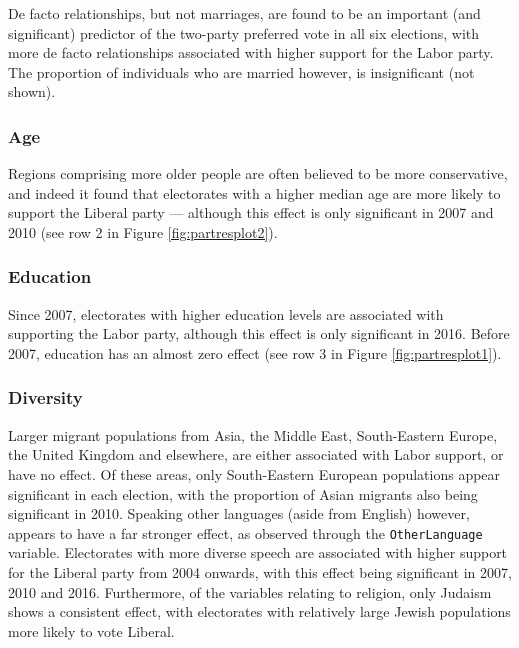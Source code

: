 \documentclass[times, doublespace]{anzsauth}
\begin{document}
De facto relationships, but not marriages, are found to be an important (and significant) predictor of the two-party preferred vote in all six elections, with more de facto relationships associated with higher support for the Labor party. The proportion of individuals who are married however, is insignificant (not shown).

\hypertarget{age}{%
\subsubsection*{Age}\label{age}}

Regions comprising more older people are often believed to be more conservative, and indeed it found that electorates with a higher median age are more likely to support the Liberal party --- although this effect is only significant in 2007 and 2010 (see row 2 in Figure \ref{fig:partresplot2}).

\hypertarget{education}{%
\subsubsection*{Education}\label{education}}

Since 2007, electorates with higher education levels are associated with supporting the Labor party, although this effect is only significant in 2016. Before 2007, education has an almost zero effect (see row 3 in Figure \ref{fig:partresplot1}).

\hypertarget{diversity}{%
\subsubsection*{Diversity}\label{diversity}}

Larger migrant populations from Asia, the Middle East, South-Eastern Europe, the United Kingdom and elsewhere, are either associated with Labor support, or have no effect. Of these areas, only South-Eastern European populations appear significant in each election, with the proportion of Asian migrants also being significant in 2010. Speaking other languages (aside from English) however, appears to have a far stronger effect, as observed through the \texttt{OtherLanguage} variable. Electorates with more diverse speech are associated with higher support for the Liberal party from 2004 onwards, with this effect being significant in 2007, 2010 and 2016. Furthermore, of the variables relating to religion, only Judaism shows a consistent effect, with electorates with relatively large Jewish populations more likely to vote Liberal.
\end{document}
